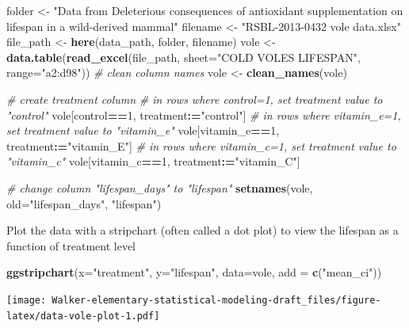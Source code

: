 \documentclass[]{book}
\newenvironment{Shaded}{\begin{snugshade}}{\end{snugshade}}
\newcommand{\KeywordTok}[1]{\textcolor[rgb]{0.13,0.29,0.53}{\textbf{#1}}}
\newcommand{\DataTypeTok}[1]{\textcolor[rgb]{0.13,0.29,0.53}{#1}}
\newcommand{\DecValTok}[1]{\textcolor[rgb]{0.00,0.00,0.81}{#1}}
\newcommand{\StringTok}[1]{\textcolor[rgb]{0.31,0.60,0.02}{#1}}
\newcommand{\CommentTok}[1]{\textcolor[rgb]{0.56,0.35,0.01}{\textit{#1}}}
\newcommand{\OperatorTok}[1]{\textcolor[rgb]{0.81,0.36,0.00}{\textbf{#1}}}
\newcommand{\ErrorTok}[1]{\textcolor[rgb]{0.64,0.00,0.00}{\textbf{#1}}}
\newcommand{\NormalTok}[1]{#1}
\begin{document}
\begin{Shaded}
\begin{Highlighting}[]
\NormalTok{folder <-}\StringTok{ "Data from Deleterious consequences of antioxidant supplementation on lifespan in a wild-derived mammal"}
\NormalTok{filename <-}\StringTok{ "RSBL-2013-0432 vole data.xlsx"}
\NormalTok{file_path <-}\StringTok{ }\KeywordTok{here}\NormalTok{(data_path, folder, filename)}
\NormalTok{vole <-}\StringTok{ }\KeywordTok{data.table}\NormalTok{(}\KeywordTok{read_excel}\NormalTok{(file_path, }\DataTypeTok{sheet=}\StringTok{"COLD VOLES LIFESPAN"}\NormalTok{, }\DataTypeTok{range=}\StringTok{"a2:d98"}\NormalTok{))}
\CommentTok{# clean column names}
\NormalTok{vole <-}\StringTok{ }\KeywordTok{clean_names}\NormalTok{(vole)}

\CommentTok{# create treatment column}
\CommentTok{# in rows where control=1, set treatment value to "control"}
\NormalTok{vole[control}\OperatorTok{==}\DecValTok{1}\NormalTok{, treatment}\OperatorTok{:}\ErrorTok{=}\StringTok{"control"}\NormalTok{]}
\CommentTok{# in rows where vitamin_e=1, set treatment value to "vitamin_e"}
\NormalTok{vole[vitamin_e}\OperatorTok{==}\DecValTok{1}\NormalTok{, treatment}\OperatorTok{:}\ErrorTok{=}\StringTok{"vitamin_E"}\NormalTok{]}
\CommentTok{# in rows where vitamin_c=1, set treatment value to "vitamin_c"}
\NormalTok{vole[vitamin_c}\OperatorTok{==}\DecValTok{1}\NormalTok{, treatment}\OperatorTok{:}\ErrorTok{=}\StringTok{"vitamin_C"}\NormalTok{]}

\CommentTok{# change column "lifespan_days" to "lifespan"}
\KeywordTok{setnames}\NormalTok{(vole, }\DataTypeTok{old=}\StringTok{"lifespan_days"}\NormalTok{, }\StringTok{"lifespan"}\NormalTok{)}
\end{Highlighting}
\end{Shaded}

Plot the data with a stripchart (often called a dot plot) to view the
lifespan as a function of treatment level

\begin{Shaded}
\begin{Highlighting}[]
\KeywordTok{ggstripchart}\NormalTok{(}\DataTypeTok{x=}\StringTok{"treatment"}\NormalTok{, }\DataTypeTok{y=}\StringTok{"lifespan"}\NormalTok{, }\DataTypeTok{data=}\NormalTok{vole,}
             \DataTypeTok{add =} \KeywordTok{c}\NormalTok{(}\StringTok{"mean_ci"}\NormalTok{))}
\end{Highlighting}
\end{Shaded}

\texttt{[image: Walker-elementary-statistical-modeling-draft\_files/figure-latex/data-vole-plot-1.pdf]}
\end{document}
